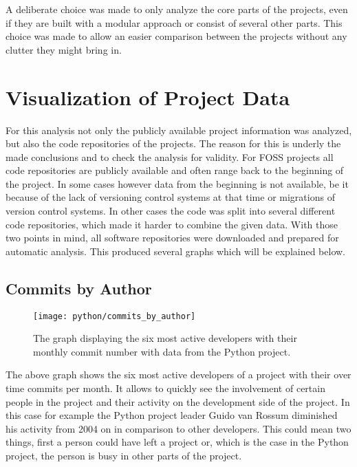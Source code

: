 A deliberate choice was made to only analyze the core parts of the projects,
even if they are built with a modular approach or consist of several other
parts. This choice was made to allow an easier comparison between the projects
without any clutter they might bring in.


\section{Visualization of Project Data} %

For this analysis not only the publicly available project information was
analyzed, but also the code repositories of the projects. The reason for this
is underly the made conclusions and to check the analysis for validity. For
\ac{FOSS} projects all code repositories are publicly available and often range
back to the beginning of the project. In some cases however data from the
beginning is not available, be it because of the lack of versioning control
systems at that time or migrations of version control systems. In other cases
the code was split into several different code repositories, which made it
harder to combine the given data. With those two points in mind, all software
repositories were downloaded and prepared for automatic analysis. This produced
several graphs which will be explained below.

\subsection{Commits by Author} %

\begin{figure}[h!t]
  \centering
  \texttt{[image: python/commits\_by\_author]}
  \caption{The graph displaying the six most active developers with their
  monthly commit number with data from the Python project.}
\end{figure}

The above graph shows the six most active developers of a project with their
over time commits per month. It allows to quickly see the involvement of
certain people in the project and their activity on the development side of the
project. In this case for example the Python project leader Guido van Rossum
diminished his activity from 2004 on in comparison to other developers. This
could mean two things, first a person could have left a project or, which is
the case in the Python project, the person is busy in other parts of the
project.

